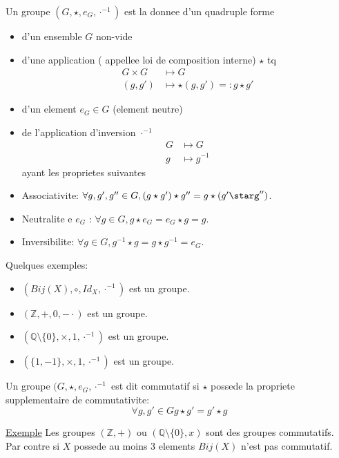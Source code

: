 \documentclass[../main.tex]{subfiles}
\begin{document}
\begin{defn}\label{defn:groupe_abstrait}
	Un groupe $(G,\star, e_G, \cdot^{-1})$ est la donnee d'un quadruple forme
	\begin{itemize}
		\item d'un ensemble $G$ non-vide\\
		\item d'une application ( appellee loi de composition interne) $\star$ tq
			\begin{align*}
				G \times G &\mapsto G\\
				( g,g') &\mapsto \star(g,g') =: g \star g'
			\end{align*}
		\item d'un element $e_G \in G$ (element neutre)\\
		\item de l'application d'inversion $\cdot^{-1}$
			\begin{align*}
			G &\mapsto G\\
			g & \mapsto g^{-1}	
			\end{align*}
		ayant les proprietes suivantes\\
	\item Associativite: $\forall g,g',g'' \in G, ( g\star g')\star g'' = g \star(g'\starg'')$.\\
	\item Neutralite e $e_G$ : $\forall g \in G, g \star e_G = e_G \star g = g$.\\
	\item Inversibilite: $\forall g \in G, g^{-1} \star g = g \star g^{-1} = e_G$.
	\end{itemize}
\end{defn}
Quelques exemples:
\begin{itemize}
	\item $(Bij(X), \circ, Id_X, \cdot^{-1}) $ est un groupe.\\
	\item $(\mathbb{Z}, +, 0, - \cdot) $ est un groupe.\\
	\item $( \mathbb{Q}\setminus \{0\}, \times, 1,  \cdot^{-1}) $ est un groupe.\\
	\item $( \{1,-1\}, \times, 1,  \cdot^{-1}) $ est un groupe.\\
\end{itemize}
\begin{defn}\label{defn:groupes_commutatifs}
	Un groupe $(G, \star, e_G, \cdot^{-1}$ est dit commutatif si $\star$ possede la propriete supplementaire de commutativite:
	\[ 
	\forall g, g' \in G  g\star g' = g' \star g
	\]
	
\end{defn}
\underline{Exemple} Les groupes $(\mathbb{Z},+)$ ou $(\mathbb{Q}\setminus \{0\},x)$ sont des groupes commutatifs.\\
Par contre si $X$ possede au moins 3 elements $Bij(X)$ n'est pas commutatif.


	
\end{document}
